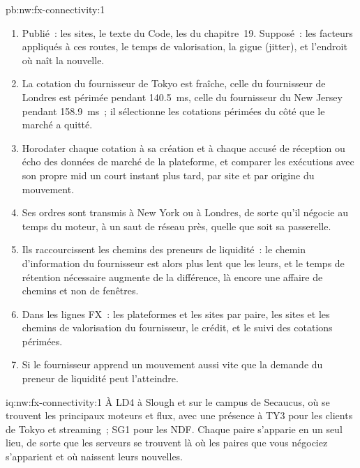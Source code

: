 \begin{solution}{pb:nw:fx-connectivity:1}
\begin{enumerate}[resume]
  tous les chemins à 1.5 fois le plancher, et \qty{185.6}{\milli\second} s'il apprend les mouvements de Tokyo par un backbone à 2.46~; le temps de rétention qui le neutraliserait
  ne serait que le temps de valorisation avec des chemins égaux, et \qty{45.1}{\milli\second} (47 pour détecter 99~\% avec la gigue (jitter)) avec le backbone, un
  délai que le Code n'autorise pas, si bien que le remède porte sur le chemin et non sur la fenêtre.
\item Publié~: les sites, le texte du Code, les  du chapitre~19. Supposé~: les facteurs appliqués à ces routes, le temps de valorisation, la
  gigue (jitter), et l'endroit où naît la nouvelle.
\item La cotation du fournisseur de Tokyo est fraîche, celle du fournisseur de Londres est périmée pendant \qty{140.5}{\milli\second}, celle du fournisseur du New Jersey pendant
  \qty{158.9}{\milli\second}~; il sélectionne les cotations périmées du côté que le marché a quitté.
\item Horodater chaque cotation à sa création et à chaque accusé de réception ou écho des données de marché de la plateforme, et comparer les exécutions avec son propre mid
  un court instant plus tard, par site et par origine du mouvement.
\item Ses ordres sont transmis à New York ou à Londres, de sorte qu'il négocie au temps du moteur, à un saut de réseau près, quelle que soit sa passerelle.
\item Ils raccourcissent les chemins des preneurs de liquidité~: le chemin d'information du fournisseur est alors plus lent que les leurs, et le temps de rétention nécessaire augmente de la
  différence, là encore une affaire de chemins et non de fenêtres.
\item Dans les lignes FX~: les plateformes et les sites par paire, les sites et les chemins de valorisation du fournisseur, le crédit, et le suivi des cotations périmées.
\item Si le fournisseur apprend un mouvement aussi vite que la demande du preneur de liquidité peut l'atteindre.
\end{enumerate}
\end{solution}

\begin{solution}{iq:nw:fx-connectivity:1}
À LD4 à Slough et sur le campus de Secaucus, où se trouvent les principaux moteurs et flux, avec une présence à TY3 pour les clients de Tokyo et
streaming~; SG1 pour les NDF. Chaque paire s'apparie en un seul lieu, de sorte que les serveurs se trouvent là où les paires que vous négociez s'apparient et où naissent leurs nouvelles.
\end{solution}

